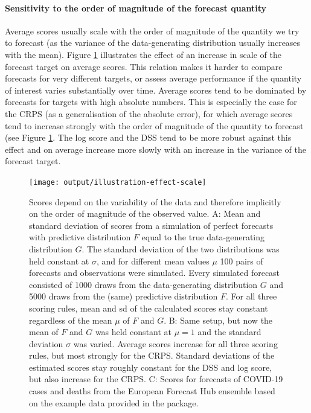 \documentclass[
]{jss}
\begin{document}
\hypertarget{sensitivity-to-the-order-of-magnitude-of-the-forecast-quantity}{%
\paragraph{Sensitivity to the order of magnitude of the forecast
quantity}\label{sensitivity-to-the-order-of-magnitude-of-the-forecast-quantity}}

Average scores usually scale with the order of magnitude of the quantity
we try to forecast (as the variance of the data-generating distribution
usually increases with the mean). Figure \ref{fig:score-scale}
illustrates the effect of an increase in scale of the forecast target on
average scores. This relation makes it harder to compare forecasts for
very different targets, or assess average performance if the quantity of
interest varies substantially over time. Average scores tend to be
dominated by forecasts for targets with high absolute numbers. This is
especially the case for the CRPS (as a generalisation of the absolute
error), for which average scores tend to increase strongly with the
order of magnitude of the quantity to forecast (see Figure
\ref{fig:score-scale}. The log score and the DSS tend to be more robust
against this effect and on average increase more slowly with an increase
in the variance of the forecast target.

\begin{CodeChunk}
\begin{figure}

{\centering \texttt{[image: output/illustration-effect-scale]} 

}

\caption[Scores depend on the variability of the data and therefore implicitly on the order of magnitude of the observed value]{Scores depend on the variability of the data and therefore implicitly on the order of magnitude of the observed value. A: Mean and standard deviation of scores from a simulation of perfect forecasts with predictive distribution $F$ equal to the true data-generating distribution $G$. The standard deviation of the two distributions was held constant at $\sigma$, and for different mean values $\mu$ 100 pairs of forecasts and observations were simulated. Every simulated forecast consisted of 1000 draws from the data-generating distribution $G$ and 5000 draws from the (same) predictive distribution $F$. For all three scoring rules, mean and sd of the calculated scores stay constant regardless of the mean $\mu$ of $F$ and $G$. B: Same setup, but now the mean of $F$ and $G$ was held constant at $\mu = 1$ and the standard deviation $\sigma$ was varied. Average scores increase for all three scoring rules, but most strongly for the CRPS. Standard deviations of the estimated scores stay roughly constant for the DSS and log score, but also increase for the CRPS. C: Scores for forecasts of COVID-19 cases and deaths from the European Forecast Hub ensemble based on the example data provided in the package.}\label{fig:score-scale}
\end{figure}
\end{CodeChunk}
\end{document}
